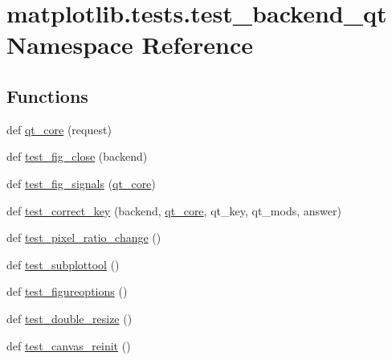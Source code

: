 \hypertarget{namespacematplotlib_1_1tests_1_1test__backend__qt}{}\section{matplotlib.\+tests.\+test\+\_\+backend\+\_\+qt Namespace Reference}
\label{namespacematplotlib_1_1tests_1_1test__backend__qt}
\subsection*{Functions}
\begin{DoxyCompactItemize}
\item 
def \hyperlink{namespacematplotlib_1_1tests_1_1test__backend__qt_a80e6c9a978c75b3481e94da1cab79351}{qt\+\_\+core} (request)
\item 
def \hyperlink{namespacematplotlib_1_1tests_1_1test__backend__qt_a7efdd2c097db3caf7e9e1088c75734b1}{test\+\_\+fig\+\_\+close} (backend)
\item 
def \hyperlink{namespacematplotlib_1_1tests_1_1test__backend__qt_a61ba59bf025ab7e760322102364987df}{test\+\_\+fig\+\_\+signals} (\hyperlink{namespacematplotlib_1_1tests_1_1test__backend__qt_a80e6c9a978c75b3481e94da1cab79351}{qt\+\_\+core})
\item 
def \hyperlink{namespacematplotlib_1_1tests_1_1test__backend__qt_a0bf5dde54aee32c3b818b7ada24941b4}{test\+\_\+correct\+\_\+key} (backend, \hyperlink{namespacematplotlib_1_1tests_1_1test__backend__qt_a80e6c9a978c75b3481e94da1cab79351}{qt\+\_\+core}, qt\+\_\+key, qt\+\_\+mods, answer)
\item 
def \hyperlink{namespacematplotlib_1_1tests_1_1test__backend__qt_a8556748d42808d900eb2060e550fce73}{test\+\_\+pixel\+\_\+ratio\+\_\+change} ()
\item 
def \hyperlink{namespacematplotlib_1_1tests_1_1test__backend__qt_aca66124cb40461da08bda84a207cf6a6}{test\+\_\+subplottool} ()
\item 
def \hyperlink{namespacematplotlib_1_1tests_1_1test__backend__qt_ad7699cfc777c897dca82337442a5be36}{test\+\_\+figureoptions} ()
\item 
def \hyperlink{namespacematplotlib_1_1tests_1_1test__backend__qt_a17af14591d526690884ff66cff522e2c}{test\+\_\+double\+\_\+resize} ()
\item 
def \hyperlink{namespacematplotlib_1_1tests_1_1test__backend__qt_afe14e078da05798edfbf7011641890b8}{test\+\_\+canvas\+\_\+reinit} ()
\end{DoxyCompactItemize}
